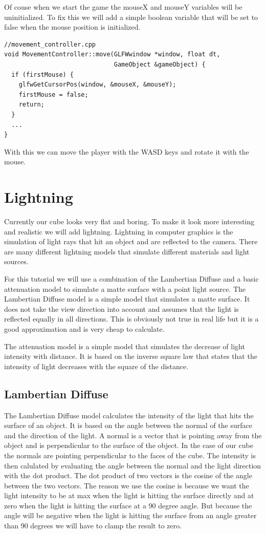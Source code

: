 \documentclass[12pt]{report} \usepackage{preamble}
\begin{document}
Of couse when we start the game the mouseX and mouseY variables will be uninitialized. To fix this we will add a simple boolean variable that will be set to false when the mouse position is initialized.

\begin{lstlisting}[Language=C++]
//movement_controller.cpp
void MovementController::move(GLFWwindow *window, float dt,
                              GameObject &gameObject) {
  if (firstMouse) {
    glfwGetCursorPos(window, &mouseX, &mouseY);
    firstMouse = false;
    return;
  }
  ...
}
\end{lstlisting}

With this we can move the player with the WASD keys and rotate it with the mouse.

\section{Lightning}

Currently our cube looks very flat and boring. To make it look more interesting and realistic we will add lightning.
Lightning in computer graphics is the simulation of light rays that hit an object and are reflected to the camera.
There are many different lightning models that simulate different materials and light sources.

For this tutorial we will use a combination of the Lambertian Diffuse and a basic attenuation model to simulate a matte surface with a point light source.
The Lambertian Diffuse model is a simple model that simulates a matte surface. It does not take the view direction into account and assumes that the light is reflected equally in all directions.
This is obviously not true in real life but it is a good approximation and is very cheap to calculate.

The attenuation model is a simple model that simulates the decrease of light intensity with distance.
It is based on the inverse square law that states that the intensity of light decreases with the square of the distance.

\subsection{Lambertian Diffuse}

The Lambertian Diffuse model calculates the intensity of the light that hits the surface of an object. It is based on the angle between the normal of the surface and the direction of the light.
A normal is a vector that is pointing away from the object and is perpendicular to the surface of the object. In the case of our cube the normals are pointing perpendicular to the faces of the cube.
The intensity is then calulated by evaluating the angle between the normal and the light direction with the dot product. The dot product of two vectors is the cosine of the angle between the two vectors.
The reason we use the cosine is because we want the light intensity to be at max when the light is hitting the surface directly and at zero when the light is hitting the surface at a 90 degree angle.
But because the angle will be negative when the light is hitting the surface from an angle greater than 90 degrees we will have to clamp the result to zero.
\end{document}
